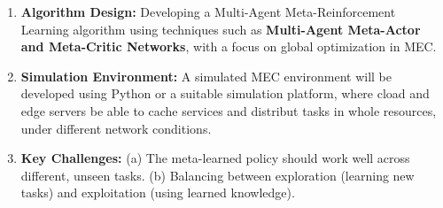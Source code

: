 \documentclass[12pt]{article}
\begin{document}
\begin{enumerate}  \item \textbf{Algorithm Design:} Developing a Multi-Agent Meta-Reinforcement Learning algorithm using techniques such as \textbf{Multi-Agent Meta-Actor and Meta-Critic Networks}, with a focus on global optimization in MEC.\vspace{-1mm}
	
	\item \textbf{Simulation Environment:} A simulated MEC environment will be developed using Python or a suitable simulation platform, where cload and edge servers be able to cache services and distribut tasks in whole resources, under different network conditions. 
	
	\item \textbf{Key Challenges:}  (a) The meta-learned policy should work well across different, unseen tasks. (b) Balancing between exploration (learning new tasks) and exploitation (using learned knowledge). 
\end{enumerate}





\end{document}

